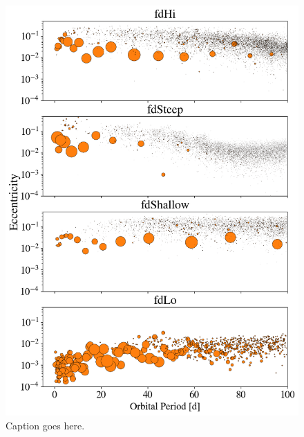 \documentclass[twocolumn]{aastex63}
\begin{document}
\begin{figure}
\begin{center}
    \includegraphics[width=\textwidth]{figures/surfden_profiles.png}
    \caption{Caption goes here.\label{fig:surfden_profiles}}
\end{center}
\end{figure}
\end{document}

